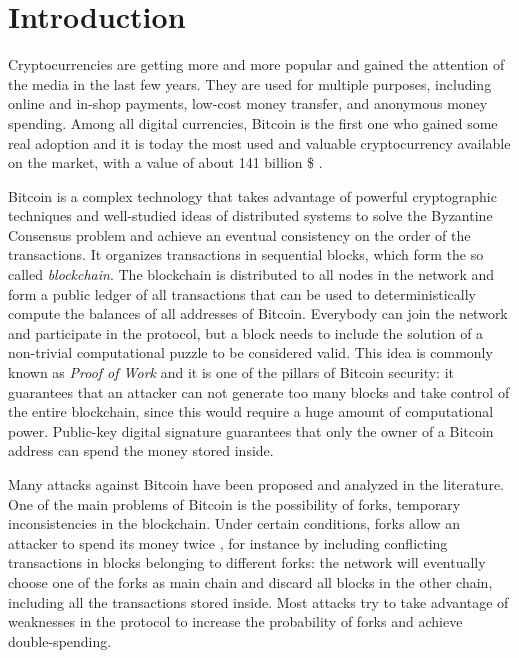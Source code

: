 \chapter{Introduction}
Cryptocurrencies are getting more and more popular and gained the attention of the media in the last few years.
They are used for multiple purposes, including online and in-shop payments, low-cost money transfer, and anonymous money spending.
Among all digital currencies, Bitcoin is the first one who gained some real adoption and it is today the most used and valuable cryptocurrency available on the market, with a value of about \num{141} billion \$ \cite{bitcoin_usage_study_2017, stats_coinmarketcap}.

Bitcoin is a complex technology that takes advantage of powerful cryptographic techniques and well-studied ideas of distributed systems to solve the Byzantine Consensus problem and achieve an eventual consistency on the order of the transactions.
It organizes transactions in sequential blocks, which form the so called \textit{blockchain}.
The blockchain is distributed to all nodes in the network and form a public ledger of all transactions that can be used to deterministically compute the balances of all addresses of Bitcoin.
Everybody can join the network and participate in the protocol, but a block needs to include the solution of a non-trivial computational puzzle to be considered valid.
This idea is commonly known as \textit{Proof of Work} \cite{pow_2002} and it is one of the pillars of Bitcoin security:
it guarantees that an attacker can not generate too many blocks and take control of the entire blockchain, since this would require a huge amount of computational power.
Public-key digital signature guarantees that only the owner of a Bitcoin address can spend the money stored inside.

Many attacks against Bitcoin have been proposed and analyzed in the literature.
One of the main problems of Bitcoin is the possibility of forks, temporary inconsistencies in the blockchain.
Under certain conditions, forks allow an attacker to spend its money twice \cite{double_spending_two_for_one}, for instance by including conflicting transactions in blocks belonging to different forks:
the network will eventually choose one of the forks as main chain and discard all blocks in the other chain, including all the transactions stored inside.
Most attacks try to take advantage of weaknesses in the protocol to increase the probability of forks and achieve double-spending.

